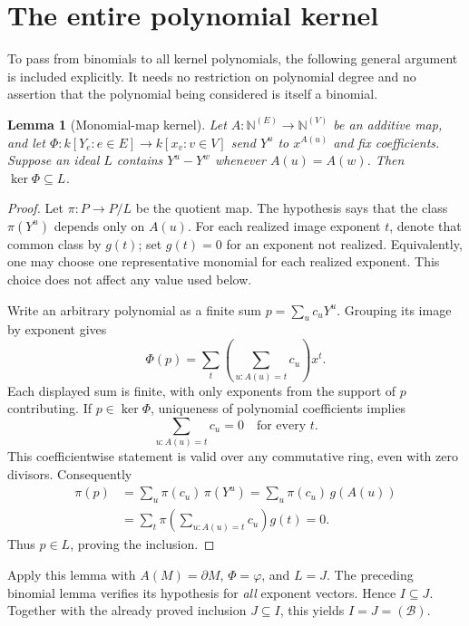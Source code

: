 \documentclass[11pt,letterpaper]{article}
\newtheorem{lemma}[theorem]{Lemma}
\newcommand{\N}{\mathbb N}
\newcommand{\dd}{\partial}
\begin{document}
\newpage
\section{The entire polynomial kernel}
To pass from binomials to all kernel polynomials, the following general
argument is included explicitly. It needs no restriction on polynomial
degree and no assertion that the polynomial being considered is itself
a binomial.

\begin{lemma}[Monomial-map kernel]
Let $A:\N^{(E)}\to\N^{(V)}$ be an additive map, and let
$\Phi:k[Y_e:e\in E]\to k[x_v:v\in V]$ send $Y^u$ to $x^{A(u)}$ and
fix coefficients. Suppose an ideal $L$ contains $Y^u-Y^w$ whenever
$A(u)=A(w)$. Then $\ker\Phi\subseteq L$.
\end{lemma}
\begin{proof}
Let $\pi:P\to P/L$ be the quotient map. The hypothesis says that the
class $\pi(Y^u)$ depends only on $A(u)$. For each realized image exponent
$t$, denote that common class by $g(t)$; set $g(t)=0$ for an exponent not
realized. Equivalently, one may choose one representative monomial for
each realized exponent. This choice does not affect any value used below.

Write an arbitrary polynomial as a finite sum
$p=\sum_u c_uY^u$. Grouping its image by exponent gives
\[
 \Phi(p)=\sum_t\left(\sum_{u:A(u)=t}c_u\right)x^t.
\]
Each displayed sum is finite, with only exponents from the support of $p$
contributing. If $p\in\ker\Phi$, uniqueness of polynomial coefficients
implies
\[
 \sum_{u:A(u)=t}c_u=0\quad\text{for every }t.
\]
This coefficientwise statement is valid over any commutative ring, even
with zero divisors. Consequently
\begin{align*}
 \pi(p)
 &=\sum_u\pi(c_u)\,\pi(Y^u)
   =\sum_u\pi(c_u)\,g(A(u))\\
 &=\sum_t\pi\!\left(\sum_{u:A(u)=t}c_u\right)g(t)=0.
\end{align*}
Thus $p\in L$, proving the inclusion.
\end{proof}

Apply this lemma with $A(M)=\dd M$, $\Phi=\varphi$, and $L=J$.
The preceding binomial lemma verifies its hypothesis for \emph{all}
exponent vectors. Hence $I\subseteq J$. Together with the already proved
inclusion $J\subseteq I$, this yields $I=J=(\mathcal B)$.
\end{document}
